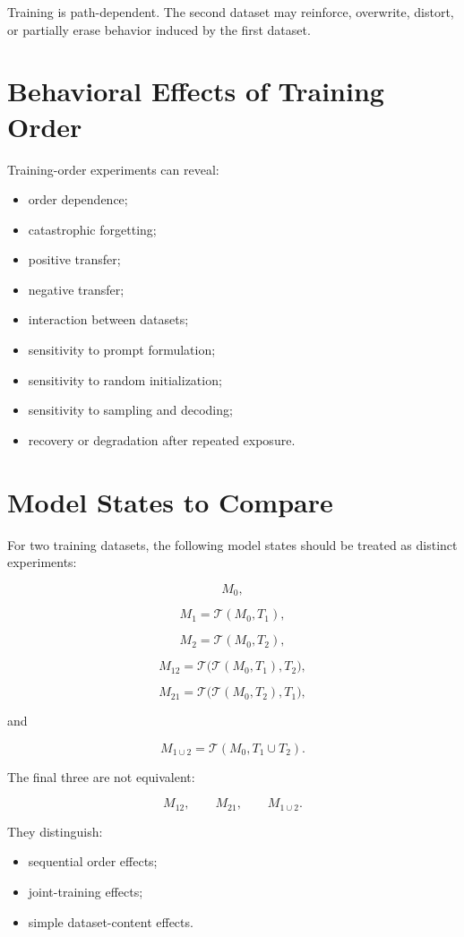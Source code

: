 \documentclass[11pt]{report}
\newcommand{\Tcal}{\mathcal{T}}
\begin{document}
Training is path-dependent. The second dataset may reinforce, overwrite, distort, or partially erase behavior induced by the first dataset.

\section{Behavioral Effects of Training Order}

Training-order experiments can reveal:

\begin{itemize}
  \item order dependence;
  \item catastrophic forgetting;
  \item positive transfer;
  \item negative transfer;
  \item interaction between datasets;
  \item sensitivity to prompt formulation;
  \item sensitivity to random initialization;
  \item sensitivity to sampling and decoding;
  \item recovery or degradation after repeated exposure.
\end{itemize}

\section{Model States to Compare}

For two training datasets, the following model states should be treated as distinct experiments:

\[
M_0,
\]

\[
M_1=\Tcal(M_0,T_1),
\]

\[
M_2=\Tcal(M_0,T_2),
\]

\[
M_{12}=\Tcal\bigl(\Tcal(M_0,T_1),T_2\bigr),
\]

\[
M_{21}=\Tcal\bigl(\Tcal(M_0,T_2),T_1\bigr),
\]

and

\[
M_{1\cup 2}=\Tcal(M_0,T_1\cup T_2).
\]

The final three are not equivalent:

\[
M_{12},\qquad M_{21},\qquad M_{1\cup2}.
\]

They distinguish:

\begin{itemize}
  \item sequential order effects;
  \item joint-training effects;
  \item simple dataset-content effects.
\end{itemize}
\end{document}
